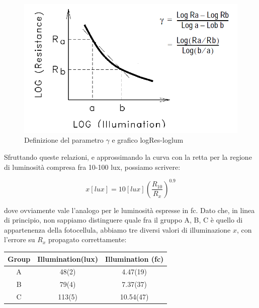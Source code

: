 \documentclass[journal, a4paper]{IEEEtran}
\begin{document}
\begin{figure}
\centering
\includegraphics[width=0.9\linewidth]{./logres_vs_logill}
\caption{Definizione del parametro $\gamma$ e grafico logRes-loglum}
\label{fig:logres_vs_logill}
\end{figure}

Sfruttando queste relazioni, e approssimando la curva con la retta per la regione di luminosità compresa fra 10-100 lux, possiamo scrivere:

\begin{equation}
x[lux] = 10[lux](\frac{R_{10}}{R_x})^{0.9}
\end{equation}

dove ovviamente vale l'analogo per le luminosità espresse in fc.
Dato che, in linea di principio, non sappiamo distinguere quale fra il gruppo A, B, C è quello di appartenenza della fotocellula, abbiamo tre diversi valori di illuminazione $x$, con l'errore su $R_x$ propagato correttamente:\\

\begin{tabular}{|c|c|c|}
\hline \textbf{Group} & \textbf{Illumination(lux)} & \textbf{Illumination (fc)} \\ 
\hline A & 48(2) & 4.47(19) \\ 
\hline B & 79(4) & 7.37(37) \\ 
\hline C & 113(5) & 10.54(47) \\ 
\hline 
\end{tabular} 
 
~\\
\end{document}
